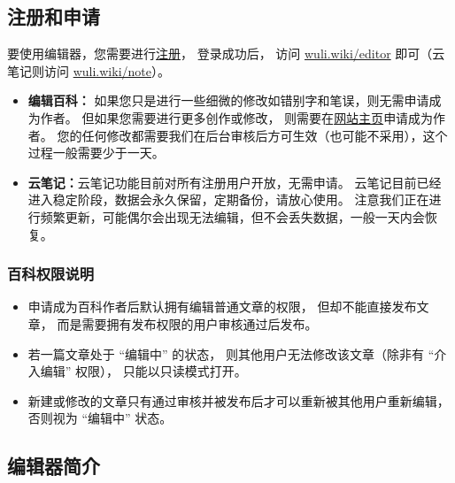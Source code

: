 \subsection{注册和申请}
要使用编辑器，您需要进行\href{https://wuli.wiki/forum}{注册}， 登录成功后， 访问 \href{https://wuli.wiki/editor/}{wuli.wiki/editor} 即可（云笔记则访问 \href{https://wuli.wiki/note/}{wuli.wiki/note}）。
\begin{itemize}
\item \textbf{编辑百科：} 如果您只是进行一些细微的修改如错别字和笔误，则无需申请成为作者。 但如果您需要进行更多创作或修改， 则需要在\href{https://wuli.wiki}{网站主页}申请成为作者。 您的任何修改都需要我们在后台审核后方可生效（也可能不采用），这个过程一般需要少于一天。
\item \textbf{云笔记：}云笔记功能目前对所有注册用户开放，无需申请。 云笔记目前已经进入稳定阶段，数据会永久保留，定期备份，请放心使用。 注意我们正在进行频繁更新，可能偶尔会出现无法编辑，但不会丢失数据，一般一天内会恢复。
\end{itemize}

\subsubsection{百科权限说明}
\begin{itemize}
\item 申请成为百科作者后默认拥有编辑普通文章的权限， 但却不能直接发布文章， 而是需要拥有发布权限的用户审核通过后发布。
\item 若一篇文章处于 “编辑中” 的状态， 则其他用户无法修改该文章（除非有 “介入编辑” 权限）， 只能以只读模式打开。
\item 新建或修改的文章只有通过审核并被发布后才可以重新被其他用户重新编辑， 否则视为 “编辑中” 状态。
\end{itemize}

\subsection{编辑器简介}

